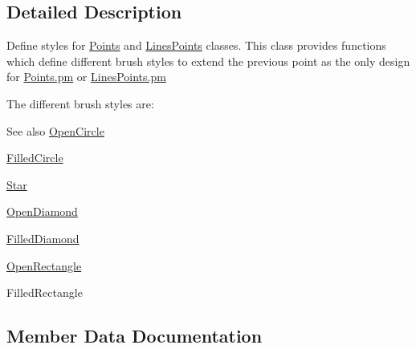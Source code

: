 \subsection{Detailed Description}
Define styles for \hyperlink{classChart_1_1Points}{Points} and \hyperlink{classChart_1_1LinesPoints}{LinesPoints} classes. This class provides functions which define different brush styles to extend the previous point as the only design for \hyperlink{Points_8pm}{Points.pm} or \hyperlink{LinesPoints_8pm}{LinesPoints.pm}\par
\par
 The different brush styles are:\par
 \begin{DoxySeeAlso}{See also}
\hyperlink{classChart_1_1BrushStyles_adbd59ea91ba902a765fce4297a69b151}{OpenCircle}\par
 

\hyperlink{classChart_1_1BrushStyles_af84643e28b62d5ddefaf36db4632824a}{FilledCircle}\par
 

\hyperlink{classChart_1_1BrushStyles_ae2f9c23e20ca5e9b329d5fe3630fc790}{Star}\par
 

\hyperlink{classChart_1_1BrushStyles_affdd85acc56b6be6068c5cc960f9857c}{OpenDiamond}\par
 

\hyperlink{classChart_1_1BrushStyles_a2c807213b768f1a0941cbd7aebee7642}{FilledDiamond}\par
 

\hyperlink{classChart_1_1BrushStyles_a3d17237567c35f8844e29e2bc7b03609}{OpenRectangle}\par
 

FilledRectangle\par
 
\end{DoxySeeAlso}


\subsection{Member Data Documentation}
\hypertarget{classChart_1_1BrushStyles_af84643e28b62d5ddefaf36db4632824a}{
\subsubsection[{FilledCircle}]{}}
\label{classChart_1_1BrushStyles_af84643e28b62d5ddefaf36db4632824a}


